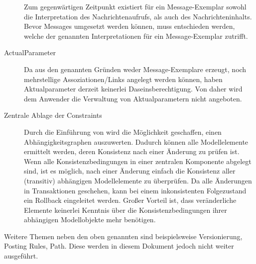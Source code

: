 \begin{description}
  	Zum gegenwärtigen Zeitpunkt existiert für ein Message-Exemplar sowohl die Interpretation des Nachrichtenaufrufs, als auch des Nachrichteninhalts.
	Bevor Messages umgesetzt werden können, muss entschieden werden, welche der genannten Interpretationen für ein Message-Exemplar zutrifft. 
  \item[ActualParameter] Da aus den genannten Gründen weder Message-Exemplare erzeugt, noch mehrstellige Assoziationen/Links angelegt werden können, 
  	haben Aktualparameter derzeit keinerlei Daseinsberechtigung. Von daher wird dem Anwender die Verwaltung von Aktualparametern nicht angeboten.
  \item[Zentrale Ablage der Constraints] Durch die Einführung von  wird die Möglichkeit geschaffen, einen Abhängigkeitsgraphen 
	auszuwerten. Dadurch können alle Modellelemente ermittelt werden, deren Konsistenz nach einer Änderung zu prüfen ist. Wenn alle Konsistenzbedingungen 
	in einer zentralen Komponente abgelegt sind, ist es möglich, nach einer Änderung einfach die Konsistenz aller (transitiv) abhängigen Modellelemente zu überprüfen. 
	Da alle Änderungen in Transaktionen geschehen, kann bei einem inkonsistenten Folgezustand ein Rollback eingeleitet werden.
	Großer Vorteil ist, dass veränderliche Elemente keinerlei Kenntnis über die Konsistenzbedingungen ihrer abhängigen Modellobjekte mehr benötigen.
\end{description}

Weitere Themen neben den oben genannten sind beispielsweise Versionierung, Posting Rules, Path. Diese werden in diesem Dokument jedoch nicht weiter ausgeführt.